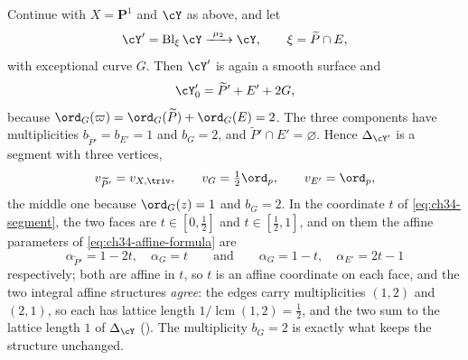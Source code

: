 \begin{example}
\label{ex:ch34-two-corner}
Continue with $X=\mathbf P^1$ and $\cY$ as above, and let
\[
 \cY'=\operatorname{Bl}_\xi\cY\xrightarrow{\ \mu_2\ }\cY,
 \qquad \xi=\widetilde P\cap E,
\]
with exceptional curve $G$.  Then $\cY'$ is again a smooth surface and
\begin{equation}
\label{eq:ch34-two-corner-central-fibre}
 \cY'_0=\widetilde P'+E'+2G,
\end{equation}
because $\ord_G(\varpi)=\ord_G(\widetilde P)+\ord_G(E)=2$.  The three
components have multiplicities $b_{\widetilde P'}=b_{E'}=1$ and
$b_G=2$, and $\widetilde P'\cap E'=\varnothing$.  Hence
$\Delta_{\cY'}$ is a segment with three vertices,
\[
 v_{\widetilde P'}=v_{X,\triv},
 \qquad
 v_G=\tfrac12\ord_p,
 \qquad
 v_{E'}=\ord_p,
\]
the middle one because $\ord_G(z)=1$ and $b_G=2$.  In the coordinate
$t$ of \eqref{eq:ch34-segment}, the two faces are
$t\in[0,\tfrac12]$ and $t\in[\tfrac12,1]$, and on them the affine
parameters of \eqref{eq:ch34-affine-formula} are
\[
 \alpha_{\widetilde P'}=1-2t,\quad\alpha_G=t
 \qquad\text{and}\qquad
 \alpha_G=1-t,\quad\alpha_{E'}=2t-1
\]
respectively; both are affine in $t$, so $t$ is an affine coordinate on
each face, and the two integral affine structures \emph{agree}: the edges
carry multiplicities $(1,2)$ and $(2,1)$, so each has lattice length
$1/\operatorname{lcm}(1,2)=\tfrac12$, and the two sum to the lattice length
$1$ of $\Delta_{\cY}$ ().  The multiplicity
$b_G=2$ is exactly what keeps the structure unchanged.


\end{example}
